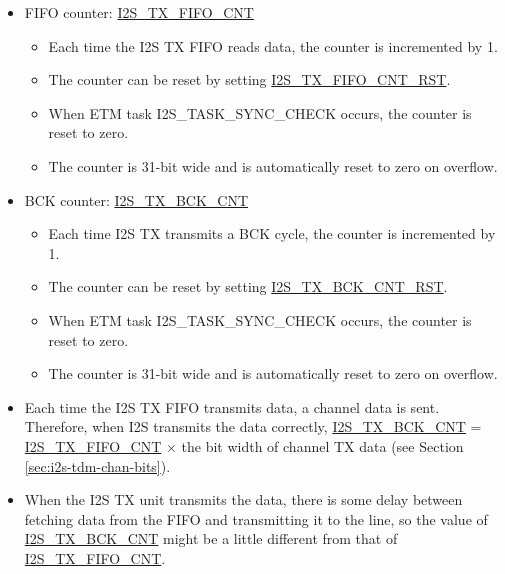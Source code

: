 \documentclass[main\_\_EN.tex]{subfiles}
\begin{document}
\begin{itemize}
    \item FIFO counter: \hyperref[fielddesc:I2STXFIFOCNT]{I2S\_TX\_FIFO\_CNT}
    \begin{itemize}
        \item Each time the I2S TX FIFO reads data, the counter is incremented by 1.
        \item The counter can be reset by setting \hyperref[fielddesc:I2STXFIFOCNTRST]{I2S\_TX\_FIFO\_CNT\_RST}.
        \item When ETM task I2S\_TASK\_SYNC\_CHECK occurs, the counter is reset to zero.
        \item The counter is 31-bit wide and is automatically reset to zero on overflow.
    \end{itemize}
    \item BCK counter: \hyperref[fielddesc:I2STXBCKCNT]{I2S\_TX\_BCK\_CNT}
    \begin{itemize}
        \item Each time I2S TX transmits a BCK cycle, the counter is incremented by 1.
        \item The counter can be reset by setting \hyperref[fielddesc:I2STXBCKCNTRST]{I2S\_TX\_BCK\_CNT\_RST}.
        \item When ETM task I2S\_TASK\_SYNC\_CHECK occurs, the counter is reset to zero.
        \item The counter is 31-bit wide and is automatically reset to zero on overflow.
    \end{itemize}
\end{itemize}

\vspace{-0.5em}
\begin{tiplisting}
\vspace{-2em}
\begin{itemize}
    \item Each time the I2S TX FIFO transmits data, a channel data is sent. Therefore, when I2S transmits the data correctly, \hyperref[fielddesc:I2STXBCKCNT]{I2S\_TX\_BCK\_CNT} = \hyperref[fielddesc:I2STXFIFOCNT]{I2S\_TX\_FIFO\_CNT} $\times$ the bit width of channel TX data (see Section \ref{sec:i2s-tdm-chan-bits}).
    \item When the I2S TX unit transmits the data, there is some delay between fetching data from the FIFO and transmitting it to the line, so the value of \hyperref[fielddesc:I2STXBCKCNT]{I2S\_TX\_BCK\_CNT} might be a little different from that of \hyperref[fielddesc:I2STXFIFOCNT]{I2S\_TX\_FIFO\_CNT}.
\end{itemize}
\end{tiplisting}
\vspace{-1em}
\end{document}
